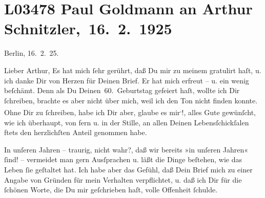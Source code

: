 

\section[ Paul Goldmann an Arthur Schnitzler, 16. 2. 1925]{L03478 Paul Goldmann an Arthur Schnitzler, 16. 2. 1925}
\nopagebreak{}
\rehead{ }\normalsize\beginnumbering{}
\toendnotes[C]{\smallbreak\pagebreak[2]}
\toendnotes[C]{\smallbreak}
\pstart
           {\pb}Berlin, 16. 2. 25.\pend
           
\pstart{}Lieber Arthur,\pend\vspace{0.5em}
\pstart
           Es hat mich ſehr gerührt, daß Du mir zu meinem \label{K_L03478-1v}\label{K_L03478-1} gratulirt haſt, u. ich danke Dir von Herzen für Deinen Brief. Er hat mich
               erfreut – u. ein wenig beſchämt. Denn als Du \label{K_L03478-2v}\label{K_L03478-2} Deinen 60. Geburtstag gefeiert haſt, wollte ich Dir ſchreiben, brachte es
               aber nicht über mich, weil ich den Ton nicht finden konnte. Ohne Dir zu ſchreiben,
               habe ich Dir aber, glaube es mir\substVorne{}\textsuperscript{,}\substDazwischen{}!\substHinten{}, alles Gute gewünſcht, wie ich überhaupt, von fern {\pb}u. in  der
               Stille, an allen Deinen Lebensſchickſalen ftets den herzlichſten Anteil genommen
               habe.\pend
           
\pstart
           In unſeren Jahren – traurig, nicht wahr?, daß wir bereits »in unſeren Jahren« ſind! –
               vermeidet man gern Ausſprachen u. läßt die Dinge beſtehen, wie das Leben ſie
               geſtaltet hat. Ich habe aber das Gefühl, daß Dein Brief mich zu einer Angabe von
               Gründen für mein Verhalten verpflichtet, u. daß ich Dir für die ſchönen Worte, die Du
               mir geſchrieben haſt, volle Offenheit ſchulde.\pend
           
